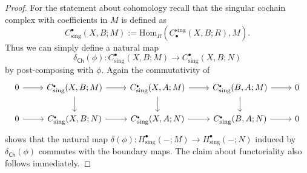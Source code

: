 \begin{proof}
For the statement about cohomology recall that the singular cochain complex with coefficients in $M$ is defined as 
\[
C^\bullet_\mathrm{sing}(X,B;M) := \mathrm{Hom}_R(C_\bullet^\mathrm{sing}(X,B;R),M).
\]
Thus we can simply define a natural map 
\[
\delta_\mathsf{Ch}(\phi) \colon C^\bullet_\mathrm{sing}(X,B;M) \to C^\bullet_\mathrm{sing}(X,B;N)
\]
by post-composing with $\phi$. Again the commutativity of 
\[\begin{tikzcd}
	0 & {C^\bullet_\mathrm{sing}(X,B;M)} & {C^\bullet_\mathrm{sing}(X,A;M)} & {C^\bullet_\mathrm{sing}(B,A;M)} & 0 \\
	0 & {C^\bullet_\mathrm{sing}(X,B;N)} & {C^\bullet_\mathrm{sing}(X,A;N)} & {C^\bullet_\mathrm{sing}(B,A;N)} & 0
	\arrow[from=1-1, to=1-2]
	\arrow[from=1-2, to=1-3]
	\arrow[from=1-2, to=2-2]
	\arrow[from=1-3, to=1-4]
	\arrow[from=1-3, to=2-3]
	\arrow[from=1-4, to=1-5]
	\arrow[from=1-4, to=2-4]
	\arrow[from=2-1, to=2-2]
	\arrow[from=2-2, to=2-3]
	\arrow[from=2-3, to=2-4]
	\arrow[from=2-4, to=2-5]
\end{tikzcd}\]
shows that the natural map $\delta(\phi) \colon H^\bullet_\mathrm{sing}(-;M) \to H^\bullet_\mathrm{sing}(-;N)$ induced by $\delta_\mathsf{Ch}(\phi)$ commutes with the boundary maps. The claim about functoriality also follows immediately.
\end{proof}